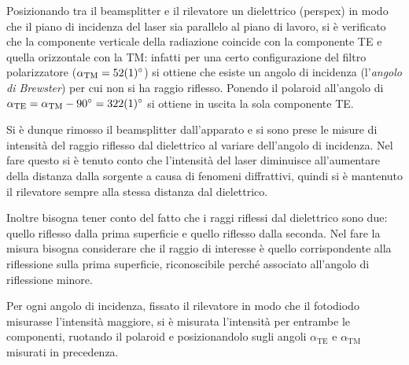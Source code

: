 \documentclass[10pt,oneside,a4paper]{article}
\begin{document}
\begin{multicols}{2}
Posizionando tra il beamsplitter e il rilevatore un dielettrico (perspex) in modo che il piano di incidenza del laser sia parallelo al piano di lavoro, si è verificato che la componente verticale della radiazione coincide con la componente TE e quella orizzontale con la TM: infatti per una certo configurazione del filtro polarizzatore ($\alpha_\text{TM} = \SI{52 \pm 1}{\degree}$) si ottiene che esiste un angolo di incidenza (l'\emph{angolo di Brewster}) per cui non si ha raggio riflesso. Ponendo il polaroid  all'angolo di $\alpha_\text{TE} = \alpha_\text{TM} - \SI{90}{\degree} = \SI{322 \pm 1}{\degree}$ si ottiene in uscita la sola componente TE.

Si è dunque rimosso il beamsplitter dall'apparato e si sono prese le misure di intensità del raggio riflesso dal dielettrico al variare dell'angolo di incidenza. Nel fare questo si è tenuto conto che l'intensità del laser diminuisce all'aumentare della distanza dalla sorgente a causa di fenomeni diffrattivi, quindi si è mantenuto il rilevatore sempre alla stessa distanza dal dielettrico.

Inoltre bisogna tener conto del fatto che i raggi riflessi dal dielettrico sono due: quello riflesso dalla prima superficie e quello riflesso dalla seconda. Nel fare la misura bisogna considerare che il raggio di interesse è quello corrispondente alla riflessione sulla prima superficie, riconoscibile perché associato all'angolo di riflessione minore.

Per ogni angolo di incidenza, fissato il rilevatore in modo che il fotodiodo misurasse l'intensità maggiore, si è misurata l'intensità per entrambe le componenti, ruotando il polaroid e posizionandolo sugli angoli $\alpha_{\text{TE}}$ e $\alpha_{\text{TM}}$ misurati in precedenza.


\end{multicols}
\end{document}
